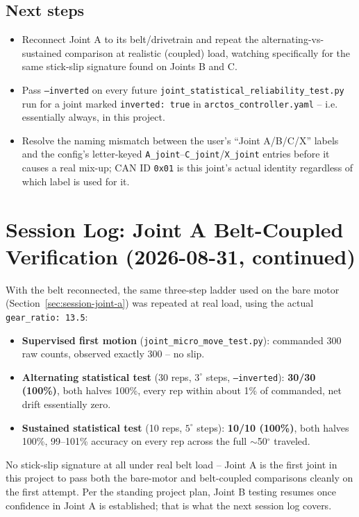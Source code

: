 \documentclass[11pt,letterpaper]{article}
\begin{document}
\subsection{Next steps}
\begin{itemize}
    \item Reconnect Joint A to its belt/drivetrain and repeat the alternating-vs-sustained comparison at realistic (coupled) load, watching specifically for the same stick-slip signature found on Joints B and C.
    \item Pass \texttt{--inverted} on every future \texttt{joint\_statistical\_reliability\_test.py} run for a joint marked \texttt{inverted: true} in \texttt{arctos\_controller.yaml} -- i.e. essentially always, in this project.
    \item Resolve the naming mismatch between the user's ``Joint A/B/C/X'' labels and the config's letter-keyed \texttt{A\_joint}--\texttt{C\_joint}/\texttt{X\_joint} entries before it causes a real mix-up; CAN ID \texttt{0x01} is this joint's actual identity regardless of which label is used for it.
\end{itemize}

\section{Session Log: Joint A Belt-Coupled Verification (2026-08-31, continued)}
\label{sec:session-joint-a-coupled}

With the belt reconnected, the same three-step ladder used on the bare motor (Section~\ref{sec:session-joint-a}) was repeated at real load, using the actual \texttt{gear\_ratio: 13.5}:
\begin{itemize}
    \item \textbf{Supervised first motion} (\texttt{joint\_micro\_move\_test.py}): commanded 300 raw counts, observed exactly 300 -- no slip.
    \item \textbf{Alternating statistical test} (30 reps, $3^\circ$ steps, \texttt{--inverted}): \textbf{30/30 (100\%)}, both halves 100\%, every rep within about 1\% of commanded, net drift essentially zero.
    \item \textbf{Sustained statistical test} (10 reps, $5^\circ$ steps): \textbf{10/10 (100\%)}, both halves 100\%, 99--101\% accuracy on every rep across the full $\sim$50$^\circ$ traveled.
\end{itemize}
No stick-slip signature at all under real belt load -- Joint A is the first joint in this project to pass both the bare-motor and belt-coupled comparisons cleanly on the first attempt. Per the standing project plan, Joint B testing resumes once confidence in Joint A is established; that is what the next session log covers.
\end{document}
